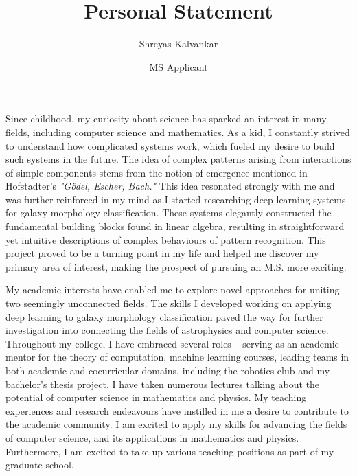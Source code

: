 \documentclass[12pt]{article}
\title{Personal Statement}
\author{Shreyas Kalvankar}
\date{MS Applicant}
\begin{document}
  \maketitle%
  \thispagestyle{empty}

\vspace{5pt}

Since childhood, my curiosity about science has sparked an
interest in many fields, including computer science and mathematics. As a kid, I
constantly strived to understand how complicated systems work, which fueled my
desire to build such systems in the future. The idea of complex patterns arising
from interactions of simple components stems from the notion of emergence
mentioned in Hofstadter’s \textit{"Gödel, Escher, Bach."} This idea resonated strongly
with me and was further reinforced in my mind as I started researching deep
learning systems for galaxy morphology classification. These systems elegantly
constructed the fundamental building blocks found in linear algebra, resulting
in straightforward yet intuitive descriptions of complex behaviours of pattern
recognition. This project proved to be a turning point in my life and helped me
discover my primary area of interest, making the prospect of pursuing an M.S.
more exciting.

My academic interests have enabled me to explore novel approaches for uniting
two seemingly unconnected fields. The skills I developed working on applying
deep learning to galaxy morphology classification paved the way for further
investigation into connecting the fields of astrophysics and computer science.
Throughout my college, I have embraced several roles -- serving as an academic
mentor for the theory of computation, machine learning courses, leading teams in
both academic and cocurricular domains, including the robotics club and my
bachelor’s thesis project. I have taken numerous lectures talking about the
potential of computer science in mathematics and physics. My teaching
experiences and research endeavours have instilled in me a desire to contribute
to the academic community. I am excited to apply my skills for advancing the
fields of computer science, and its applications in mathematics and physics.
Furthermore, I am excited to take up various teaching positions as part of my
graduate school.
\end{document}
